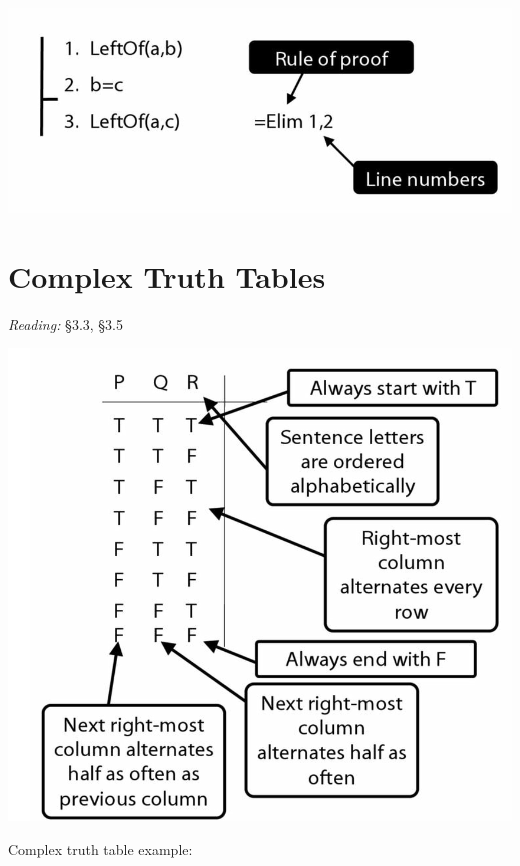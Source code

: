 \documentclass[12pt]{extarticle}
\begin{document}
\begin{multicols*}{3}
\begin{center}
\includegraphics[scale=0.3]{img/how_to_write_proofs.png}
\end{center}
 
 
\section{Complex Truth Tables}
 
\emph{Reading:} §3.3, §3.5
 
\begin{center}
\includegraphics[scale=0.3]{img/how_to_write_truth_tables.png}
\end{center}
\begin{minipage}{\columnwidth}
 
Complex truth table example:
 

\end{minipage}
\end{multicols*}
\end{document}
